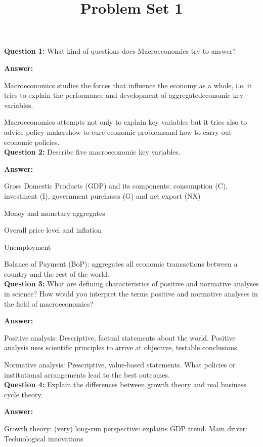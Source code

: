 \documentclass[a4paper]{article}
\title{Problem Set 1}
\begin{document}
\maketitle

\textbf{Question 1:} What kind of questions does Macroeconomics try to answer? 

\textbf{Answer:} 

Macroeconomics studies the forces that influence the economy as a whole, i.e. it tries to explain the performance and development of aggregatedeconomic key variables.

Macroeconomics attempts not only to explain key variables but it tries also to advice policy makershow to cure economic problemsand how to carry out economic policies. \\

\textbf{Question 2:} Describe five macroeconomic key variables. 

\textbf{Answer:} 

Gross Domestic Products (GDP) and its components: consumption (C), investment (I), government purchases (G) and net export (NX) 

Money and monetary aggregates 

Overall price level and inflation 

Unemployment 

Balance of Payment (BoP): aggregates all economic transactions between a country and the rest of the world. \\

\textbf{Question 3:} What are defining characteristics of positive and normative analyses in science? How would you interpret the terms positive and normative analyses in the field of macroeconomics? 

\textbf{Answer:}

Positive analysis: Descriptive, factual statements about the world. Positive analysis uses scientific principles to arrive at objective, testable conclusions. 

Normative analysis: Prescriptive, value-based statements. What policies or institutional arrangements lead to the best outcomes. \\

\textbf{Question 4:} Explain the differences between growth theory and real business cycle theory. 

\textbf{Answer:}

Growth theory: (very) long-run perspective: explains GDP trend. Main driver: Technological innovations 
\end{document}
